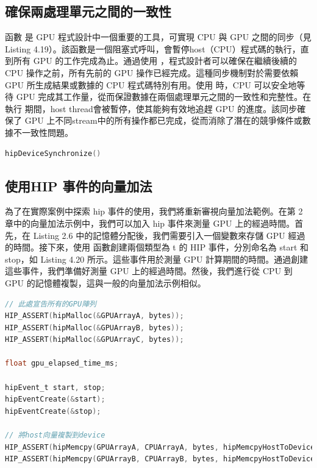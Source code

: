 \subsection{確保兩處理單元之間的一致性}
函數  是 GPU 程式設計中一個重要的工具，可實現 CPU 與 GPU 之間的同步（見 Listing 4.19）。該函數是一個阻塞式呼叫，會暫停host（CPU）程式碼的執行，直到所有 GPU 的工作完成為止。通過使用 ，程式設計者可以確保在繼續後續的 CPU 操作之前，所有先前的 GPU 操作已經完成。這種同步機制對於需要依賴 GPU 所生成結果或數據的 CPU 程式碼特別有用。使用  時，CPU 可以安全地等待 GPU 完成其工作量，從而保證數據在兩個處理單元之間的一致性和完整性。在執行  期間，host thread會被暫停，使其能夠有效地追趕 GPU 的進度。該同步確保了 GPU 上不同stream中的所有操作都已完成，從而消除了潛在的競爭條件或數據不一致性問題。

\begin{lstlisting}[language=C, caption={使用 hipDeviceSynchronize()
確保兩個處理單元之間的一致性}, label={19th:example}]
hipDeviceSynchronize()
\end{lstlisting}

\subsection{使用HIP 事件的向量加法}
為了在實際案例中探索 hip 事件的使用，我們將重新審視向量加法範例。在第 2 章中的向量加法示例中，我們可以加入 hip 事件來測量 GPU 上的經過時間。首先，在 Listing 2.6 中的記憶體分配後，我們需要引入一個變數來存儲 GPU 經過的時間。接下來，使用  函數創建兩個類型為 t 的 HIP 事件，分別命名為 start 和 stop，如 Listing 4.20 所示。這些事件用於測量 GPU 計算期間的時間。通過創建這些事件，我們準備好測量 GPU 上的經過時間。然後，我們進行從 CPU 到 GPU 的記憶體複製，這與一般的向量加法示例相似。

\begin{lstlisting}[language=C, caption={GPU的記憶體配置與CPU到GPU的記憶體複製}, label={20th:example}]
// 此處宣告所有的GPU陣列
HIP_ASSERT(hipMalloc(&GPUArrayA, bytes));
HIP_ASSERT(hipMalloc(&GPUArrayB, bytes));
HIP_ASSERT(hipMalloc(&GPUArrayC, bytes));

float gpu_elapsed_time_ms;

hipEvent_t start, stop;
hipEventCreate(&start);
hipEventCreate(&stop);

// 將host向量複製到device
HIP_ASSERT(hipMemcpy(GPUArrayA, CPUArrayA, bytes, hipMemcpyHostToDevice));
HIP_ASSERT(hipMemcpy(GPUArrayB, CPUArrayB, bytes, hipMemcpyHostToDevice));
\end{lstlisting}

